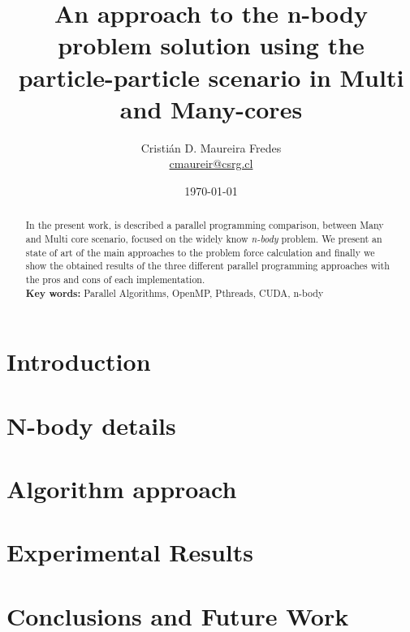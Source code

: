 \documentclass[letter, 10pt]{IEEEtran}
\begin{document}
\pagestyle{empty}

\title{An approach to the n-body problem solution using the particle-particle scenario in Multi and Many-cores}
\author{Cristián D. Maureira Fredes\\\url{cmaureir@csrg.cl}}
\date{\today}

\maketitle
\begin{abstract}
In the present work, is described a parallel programming
comparison, between Many and Multi core scenario,
focused on the widely know \emph{n-body} problem.
We present an state of art of the main approaches to
the problem force calculation and finally
we show the obtained results of the three different
parallel programming approaches with the pros and cons
of each implementation.
\\
\textbf{Key words:} Parallel Algorithms, OpenMP, Pthreads, CUDA, n-body

\end{abstract}

\section{Introduction}
\label{introduction}



\section{N-body details}
\label{nbody-details}



\section{Algorithm approach}
\label{algorithm}



\section{Experimental Results}
\label{experimental}


\section{Conclusions and Future Work}
\label{conclusions}




\end{document}
